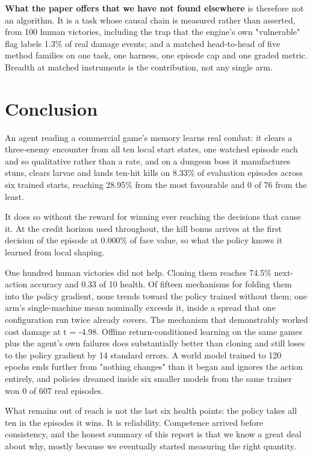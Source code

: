 \documentclass[11pt]{article}
\begin{document}
\textbf{What the paper offers that we have not found elsewhere} is therefore not an algorithm. It is a task whose causal chain is measured rather than asserted, from 100 human victories, including the trap that the engine's own "vulnerable" flag labels 1.3\% of real damage events; and a matched head-to-head of five method families on one task, one harness, one episode cap and one graded metric. Breadth at matched instruments is the contribution, not any single arm.


\section{Conclusion}
\label{sec:15}

An agent reading a commercial game's memory learns real combat: it clears a three-enemy encounter from all ten local start states, one watched episode each and so qualitative rather than a rate, and on a dungeon boss it manufactures stuns, clears larvae and lands ten-hit kills on 8.33\% of evaluation episodes across six trained starts, reaching 28.95\% from the most favourable and 0 of 76 from the least.

It does so without the reward for winning ever reaching the decisions that cause it. At the credit horizon used throughout, the kill bonus arrives at the first decision of the episode at 0.000\% of face value, so what the policy knows it learned from local shaping.

One hundred human victories did not help. Cloning them reaches 74.5\% next-action accuracy and 0.33 of 10 health. Of fifteen mechanisms for folding them into the policy gradient, none trends toward the policy trained without them; one arm's single-machine mean nominally exceeds it, inside a spread that one configuration run twice already covers. The mechanism that demonstrably worked cost damage at t = -4.98. Offline return-conditioned learning on the same games plus the agent's own failures does substantially better than cloning and still loses to the policy gradient by 14 standard errors. A world model trained to 120 epochs ends further from "nothing changes" than it began and ignores the action entirely, and policies dreamed inside six smaller models from the same trainer won 0 of 607 real episodes.

What remains out of reach is not the last six health points: the policy takes all ten in the episodes it wins. It is reliability. Competence arrived before consistency, and the honest summary of this report is that we know a great deal about why, mostly because we eventually started measuring the right quantity.
\end{document}
